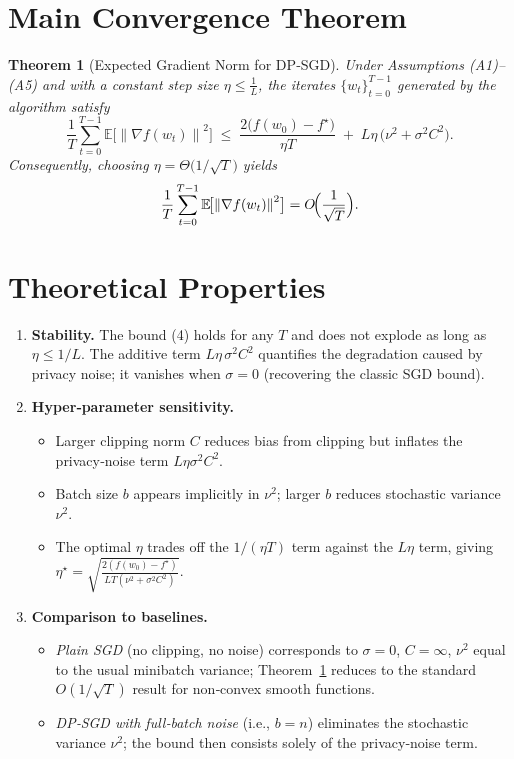 \documentclass{article}
\newtheorem{theorem}{Theorem}
\newcommand{\E}{\mathbb{E}}
\newcommand{\norm}[1]{\left\|#1\right\|}
\newcommand{\grad}{\nabla}
\newcommand{\sig}{\sigma}
\begin{document}
\section*{Main Convergence Theorem}
\begin{theorem}[Expected Gradient Norm for DP‑SGD]\label{thm:main}
Under Assumptions (A1)–(A5) and with a constant step size $\eta\le\frac{1}{L}$, the iterates $\{w_t\}_{t=0}^{T-1}$ generated by the algorithm satisfy
\[
\frac{1}{T}\sum_{t=0}^{T-1}\E\!\bigl[\norm{\grad f(w_t)}^2\bigr]
\;\le\;
\frac{2\bigl(f(w_0)-f^\star\bigr)}{\eta T}
\;+\;
L\eta\,\bigl(\nu^2+\sig^2 C^{2}\bigr).
\tag{4}
\]
Consequently, choosing $\eta=\Theta\!\bigl(1/\sqrt{T}\bigr)$ yields
\[
\frac{1}{T}\sum_{t=0}^{T-1}\E\!\bigl[\norm{\grad f(w_t)}^2\bigr]=
O\!\Bigl(\frac{1}{\sqrt{T}}\Bigr).
\]
\end{theorem}

\section*{Theoretical Properties}
\begin{enumerate}
\item \textbf{Stability.} The bound (4) holds for any $T$ and does not explode as long as $\eta\le1/L$. The additive term $L\eta\,\sig^2 C^2$ quantifies the degradation caused by privacy noise; it vanishes when $\sig=0$ (recovering the classic SGD bound).

\item \textbf{Hyper‑parameter sensitivity.}
    \begin{itemize}
        \item Larger clipping norm $C$ reduces bias from clipping but inflates the privacy‑noise term $L\eta\sig^2 C^2$.
        \item Batch size $b$ appears implicitly in $\nu^2$; larger $b$ reduces stochastic variance $\nu^2$.
        \item The optimal $\eta$ trades off the $1/(\eta T)$ term against the $L\eta$ term, giving $\eta^\star=\sqrt{\frac{2(f(w_0)-f^\star)}{L T(\nu^2+\sig^2 C^2)}}$.
    \end{itemize}
\item \textbf{Comparison to baselines.}
    \begin{itemize}
        \item \emph{Plain SGD} (no clipping, no noise) corresponds to $\sig=0$, $C=\infty$, $\nu^2$ equal to the usual minibatch variance; Theorem~\ref{thm:main} reduces to the standard $O(1/\sqrt{T})$ result for non‑convex smooth functions.
        \item \emph{DP‑SGD with full‑batch noise} (i.e., $b=n$) eliminates the stochastic variance $\nu^2$; the bound then consists solely of the privacy‑noise term.
    \end{itemize}
\end{enumerate}
\end{document}
